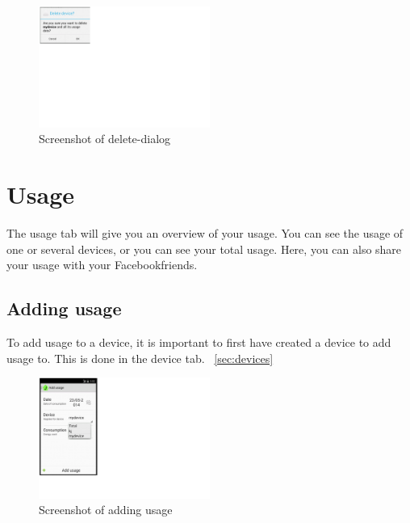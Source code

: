 \begin{figure}[H]
\centering
\includegraphics[width=0.5\textwidth, clip, trim=0cm 14cm 20cm 0cm]{appendix/usermanual/fig/ReallyDeleteDevice.png}
\caption{Screenshot of delete-dialog}
\end{figure}

\section{Usage}
The usage tab will give you an overview of your usage. You can see the usage of one or several devices, or you can see your total usage. Here, you can also share your usage with your Facebookfriends.
\subsection{Adding usage}
To add usage to a device, it is important to first have created a device to add usage to. This is done in the device tab. ~\ref{sec:devices}

\begin{figure}[H]
\centering
\includegraphics[width=0.5\textwidth, clip, trim=0cm 4cm 19.5cm 0cm]{appendix/usermanual/fig/AddUsage.png}
\caption{Screenshot of adding usage}
\end{figure}

